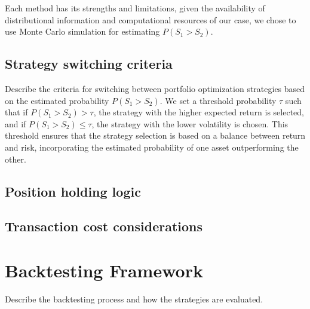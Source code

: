 Each method has its strengths and limitations, given the availability of distributional information and computational resources of our case, we chose to use Monte Carlo simulation for estimating $P(S_1 > S_2)$.


\subsection{Strategy switching criteria}
Describe the criteria for switching between portfolio optimization strategies based on the estimated probability $P(S_1 > S_2)$.
We set a threshold probability $\tau$ such that if $P(S_1 > S_2) > \tau$, the strategy with the higher expected return is selected, and if $P(S_1 > S_2) \leq \tau$, the strategy with the lower volatility is chosen. This threshold ensures that the strategy selection is based on a balance between return and risk, incorporating the estimated probability of one asset outperforming the other.
\subsection{Position holding logic}
\subsection{Transaction cost considerations}

\section{Backtesting Framework}
Describe the backtesting process and how the strategies are evaluated.


